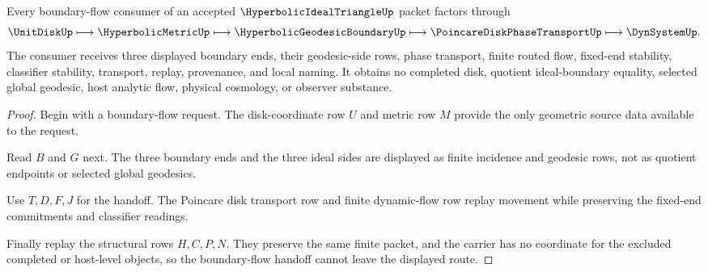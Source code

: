 \begin{theorem}
\label{thm:hyperbolic-ideal-triangle-boundary-flow-handoff}
Every boundary-flow consumer of an accepted $\HyperbolicIdealTriangleUp$ packet factors through
$$
\UnitDiskUp \longmapsto \HyperbolicMetricUp \longmapsto \HyperbolicGeodesicBoundaryUp \longmapsto \PoincareDiskPhaseTransportUp \longmapsto \DynSystemUp .
$$
The consumer receives three displayed boundary ends, their geodesic-side rows, phase transport, finite routed flow, fixed-end stability, classifier stability, transport, replay, provenance, and local naming. It obtains no completed disk, quotient ideal-boundary equality, selected global geodesic, host analytic flow, physical cosmology, or observer substance.
\end{theorem}
\begin{proof}
Begin with a boundary-flow request. The disk-coordinate row $U$ and metric row $M$ provide the only geometric source data available to the request.

Read $B$ and $G$ next. The three boundary ends and the three ideal sides are displayed as finite incidence and geodesic rows, not as quotient endpoints or selected global geodesics.

Use $T,D,F,J$ for the handoff. The Poincare disk transport row and finite dynamic-flow row replay movement while preserving the fixed-end commitments and classifier readings.

Finally replay the structural rows $H,C,P,N$. They preserve the same finite packet, and the carrier has no coordinate for the excluded completed or host-level objects, so the boundary-flow handoff cannot leave the displayed route.
\end{proof}


